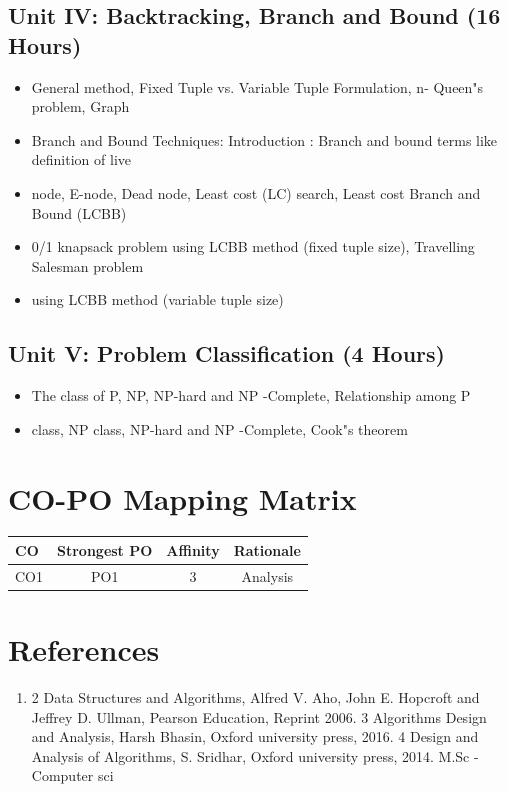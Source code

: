 \documentclass[12pt,a4paper]{article}%
\begin{document}
%
\subsection{Unit IV: Backtracking, Branch and Bound (16 Hours)}%
\label{subsec:UnitIVBacktracking,BranchandBound(16Hours)}%
\begin{itemize}%
\item General method, Fixed Tuple vs. Variable Tuple Formulation, n- Queen"s problem, Graph%
\item Branch and Bound Techniques: Introduction : Branch and bound terms like definition of live%
\item node, E-node, Dead node, Least cost (LC) search, Least cost Branch and Bound (LCBB)%
\item 0/1 knapsack problem using LCBB method (fixed tuple size), Travelling Salesman problem%
\item using LCBB method (variable tuple size)%
\end{itemize}

%
\subsection{Unit V: Problem Classification (4 Hours)}%
\label{subsec:UnitVProblemClassification(4Hours)}%
\begin{itemize}%
\item The class of P, NP, NP-hard and NP -Complete, Relationship among P%
\item class, NP class, NP-hard and NP -Complete, Cook"s theorem%
\end{itemize}

%
\section{CO{-}PO Mapping Matrix}%
\label{sec:CO{-}POMappingMatrix}%
\begin{center}%
\begin{tabular}{|l|c|c|c|}%
\hline%
\textbf{CO} & \textbf{Strongest PO} & \textbf{Affinity} & \textbf{Rationale} \\%
\hline%
CO1 & PO1 & 3 & Analysis \\%
\hline%
\end{tabular}%
\end{center}

%
\section{References}%
\label{sec:References}%
\begin{enumerate}%
\item 2 Data Structures and Algorithms, Alfred V. Aho, John E. Hopcroft and Jeffrey D. Ullman, Pearson
Education, Reprint 2006.
3 Algorithms Design and Analysis, Harsh Bhasin, Oxford university press, 2016.
4 Design and Analysis of Algorithms, S. Sridhar, Oxford university press, 2014.
M.Sc - Computer sci%
\end{enumerate}
\end{document}
